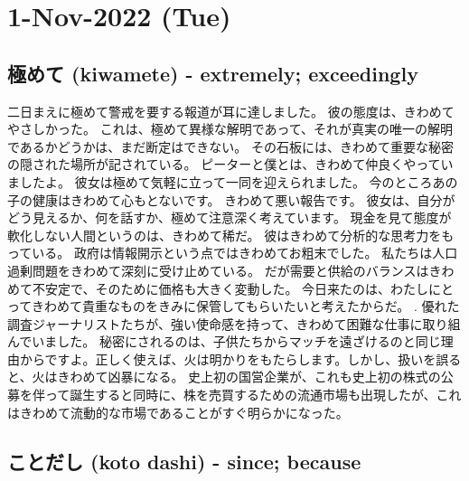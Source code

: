 \section{1-Nov-2022 (Tue)}
\subsection{極めて (kiwamete) - extremely; exceedingly}

二日まえに極めて警戒を要する報道が耳に達しました。
彼の態度は、きわめてやさしかった。
これは、極めて異様な解明であって、それが真実の唯一の解明であるかどうかは、まだ断定はできない。
その石板には、きわめて重要な秘密の隠された場所が記されている。
ピーターと僕とは、きわめて仲良くやっていましたよ。
彼女は極めて気軽に立って一同を迎えられました。
今のところあの子の健康はきわめて心もとないです。
きわめて悪い報告です。
彼女は、自分がどう見えるか、何を話すか、極めて注意深く考えています。
現金を見て態度が軟化しない人間というのは、きわめて稀だ。
彼はきわめて分析的な思考力をもっている。
政府は情報開示という点ではきわめてお粗末でした。
私たちは人口過剰問題をきわめて深刻に受け止めている。
だが需要と供給のバランスはきわめて不安定で、そのために価格も大きく変動した。
今日来たのは、わたしにとってきわめて貴重なものをきみに保管してもらいたいと考えたからだ。
. 優れた調査ジャーナリストたちが、強い使命感を持って、きわめて困難な仕事に取り組んでいました。
秘密にされるのは、子供たちからマッチを遠ざけるのと同じ理由からですよ。正しく使えば、火は明かりをもたらします。しかし、扱いを誤ると、火はきわめて凶暴になる。
史上初の国営企業が、これも史上初の株式の公募を伴って誕生すると同時に、株を売買するための流通市場も出現したが、これはきわめて流動的な市場であることがすぐ明らかになった。

\subsection{ことだし (koto dashi) - since; because}

